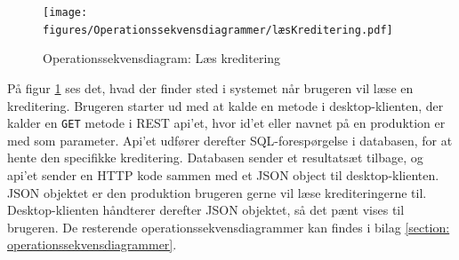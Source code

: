 \begin{figure}[H] %
\centering
\texttt{[image: figures/Operationssekvensdiagrammer/læsKreditering.pdf]}
\caption{Operationssekvensdiagram: Læs kreditering}
\label{fig:op_read_credit}
\end{figure}


På figur \ref{fig:op_read_credit} ses det, hvad der finder sted i systemet når brugeren vil læse en kreditering. Brugeren starter ud med at kalde en metode i desktop-klienten, der kalder en \texttt{GET} metode i REST api'et, hvor id'et eller navnet på en produktion er med som parameter. Api'et udfører derefter SQL-forespørgelse i databasen, for at hente den specifikke kreditering. Databasen sender et resultatsæt tilbage, og api'et sender en HTTP kode sammen med et JSON object til desktop-klienten. JSON objektet er den produktion brugeren gerne vil læse krediteringerne til. Desktop-klienten håndterer derefter JSON objektet, så det pænt vises til brugeren. De resterende operationssekvensdiagrammer kan findes i bilag \ref{section: operationssekvensdiagrammer}.





